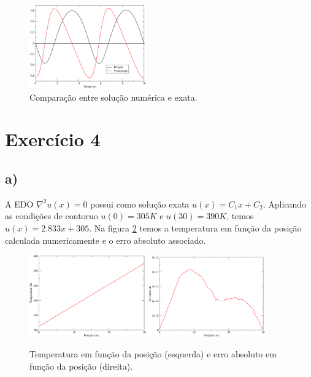 \documentclass[a4wide]{report}
\begin{document}
\begin{figure}[!tb]
\centering
\includegraphics[width=0.447\textwidth]{xev.pdf}
\caption{Comparação entre solução numérica e exata.}
\label{xeverro}
\end{figure}






\section*{Exercício 4}
\subsection*{a)}

A EDO $\nabla^2 u(x) = 0 $ possui como solução exata $u(x) = C_1 x + C_2 $. Aplicando as condições de contorno $u(0) = 305K$ e $u(30) = 390K$, temos $u(x) = 2.833 x + 305 $. Na figura \ref{u} temos a temperatura em função da posição calculada numericamente e o erro absoluto associado.

\begin{figure}[!b]
\centering
\includegraphics[width=0.447\textwidth]{u.pdf}
\includegraphics[width=0.447\textwidth]{erro.pdf}
\caption{Temperatura em função da posição (esquerda) e erro absoluto em função da posição (direita).}
\label{u}
\end{figure}
\end{document}
